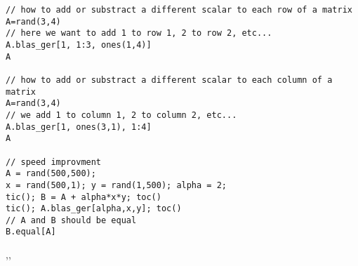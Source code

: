 \begin{examples}
\begin{Verbatim}
// how to add or substract a different scalar to each row of a matrix 
A=rand(3,4)
// here we want to add 1 to row 1, 2 to row 2, etc...
A.blas_ger[1, 1:3, ones(1,4)]
A

// how to add or substract a different scalar to each column of a matrix 
A=rand(3,4)
// we add 1 to column 1, 2 to column 2, etc...
A.blas_ger[1, ones(3,1), 1:4]
A

// speed improvment
A = rand(500,500);
x = rand(500,1); y = rand(1,500); alpha = 2;
tic(); B = A + alpha*x*y; toc()
tic(); A.blas_ger[alpha,x,y]; toc()
// A and B should be equal
B.equal[A]
\end{Verbatim}

\end{examples}

\begin{manseealso}
,,
\end{manseealso}

